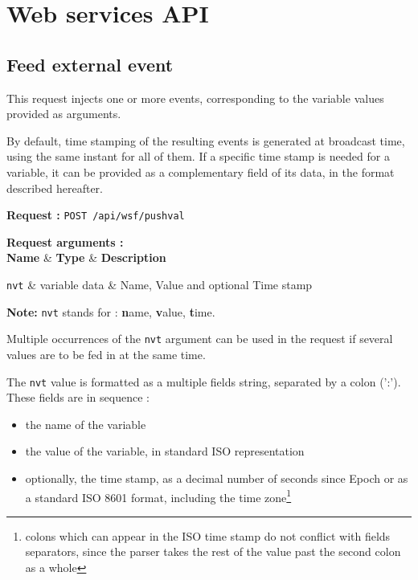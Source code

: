 \documentclass[11pt,a4paper]{article}
\newcommand{\apireq}[2]{\vspace{1em}\textbf{Request : }\texttt{#1~#2}}
\newcommand{\reqenvwidth}{\textwidth}
\newenvironment{reqargs} { %
	\vspace{1em}\textbf{Request arguments : }\hfill\\ %
	\tabularx{\reqenvwidth}{llX} %
	\textbf{Name} & \textbf{Type} & \textbf{Description}\\ %
	\midrule %
}{ %
	\endtabularx %
}
\newcommand{\reqarg}[3]{\texttt{#1} & #2 & #3 \\}
\begin{document}
\section{Web services API}

\subsection{Feed external event}

This request injects one or more events, corresponding to the variable values provided as 
arguments. 

By default, time stamping of the resulting events is generated at broadcast time, using the 
same instant for all of them. If a specific time stamp is needed for a variable, it can be 
provided as a complementary field of its data, in the format described hereafter.

\apireq{POST}{/api/wsf/pushval}

\begin{reqargs}
\reqarg{nvt}{variable data}{Name, Value and optional Time stamp}
\end{reqargs}

\textbf{Note:} \texttt{nvt} stands for : \textbf{n}ame, \textbf{v}alue, \textbf{t}ime.

Multiple occurrences of the \texttt{nvt} argument can be used in the request if several 
values are to be fed in at the same time.

The \texttt{nvt} value is formatted as a multiple fields string, separated by a colon (':'). 
These fields are in sequence :
\begin{itemize}
\item the name of the variable 
\item the value of the variable, in standard ISO representation
\item optionally, the time stamp, as a decimal number of seconds since Epoch or as a 
standard ISO 8601 format, including the time zone\footnote{colons which can appear in the 
ISO time stamp do not conflict with fields separators, since the parser takes the rest of 
the value past the second colon as a whole}
\end{itemize}
\end{document}
